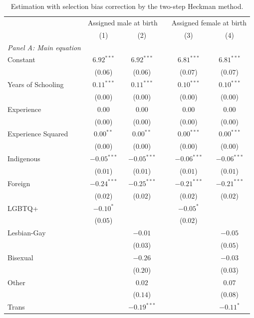 \begin{table}[H]
\begin{center}
\begin{threeparttable}
\captionsetup{margin=0.5cm}
\caption{Estimation with selection bias correction by the two-step Heckman method.}
\label{AT1}
\footnotesize
\centering
\begin{tabular}{lccccc}
\toprule
 & \multicolumn{2}{c}{Assigned male at birth} & & \multicolumn{2}{c}{Assigned female at birth} \\ 
 & (1) & (2) & & (3) & (4) \\ \midrule
\textit{Panel A: Main equation} &  & &  &  &  \\ 
Constant & $6.92^{***}$& $6.92^{***}$ & & $6.81^{***}$& $6.81^{***}$ \\ 
 & ($0.06$)& ($0.06$) & & ($0.07$)& ($0.07$) \\ 
Years of Schooling & $0.11^{***}$& $0.11^{***}$ & & $0.10^{***}$& $0.10^{***}$ \\ 
 & ($0.00$)& ($0.00$) & & ($0.00$)& ($0.00$) \\ 
Experience & $0.00$& $0.00$ & & $0.00$& $0.00$ \\ 
 & ($0.00$)& ($0.00$) & & ($0.00$)& ($0.00$) \\ 
Experience Squared & $0.00^{**}$& $0.00^{**}$ & & $0.00^{***}$& $0.00^{***}$ \\ 
 & ($0.00$)& ($0.00$) & & ($0.00$)& ($0.00$) \\ 
Indigenous & $-0.05^{***}$& $-0.05^{***}$ & & $-0.06^{***}$& $-0.06^{***}$ \\ 
 & ($0.01$)& ($0.01$) & & ($0.01$)& ($0.01$) \\ 
Foreign & $-0.24^{***}$& $-0.25^{***}$ & & $-0.21^{***}$& $-0.21^{***}$ \\ 
 & ($0.02$)& ($0.02$) & & ($0.02$)& ($0.02$) \\ 
LGBTQ+ & $-0.10^{*}$&  & & $-0.05^{*}$&  \\ 
 & ($0.05$)&  & & ($0.02$)&  \\ 
Lesbian-Gay & & $-0.01$ & & & $-0.05$ \\ 
 & & ($0.03$) & & & ($0.05$) \\ 
Bisexual & & $-0.26$ & & & $-0.03$ \\ 
 & & ($0.20$) & & & ($0.03$) \\ 
Other & & $0.02$ & & & $0.07$ \\ 
 & & ($0.14$) & & & ($0.08$) \\ 
Trans & & $-0.19^{***}$ & & & $-0.11^{*}$ \\ 

\end{tabular}
\end{threeparttable}
\end{center}
\end{table}
